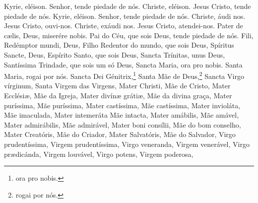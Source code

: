 \begin{paracol}{2}
Kyrie, eléison.
\switchcolumn
Senhor, tende piedade de nós.
\switchcolumn*
Christe, eléison.
\switchcolumn
Jesus Cristo, tende piedade de nós.
\switchcolumn*
Kyrie, eléison.
\switchcolumn
Senhor, tende piedade de nós.
\switchcolumn*
Christe, áudi nos.
\switchcolumn
Jesus Cristo, ouvi-nos.
\switchcolumn*
Christe, exáudi nos.
\switchcolumn
Jesus Cristo, atendei-nos.
\switchcolumn*
Pater de cælis, Deus, miserére nobis.
\switchcolumn
Pai do Céu, que sois Deus, tende piedade de nós.
\switchcolumn*
Fili, Redémptor mundi, Deus,
\switchcolumn
Filho Redentor do mundo, que sois Deus,
\switchcolumn*
Spíritus Sancte, Deus,
\switchcolumn
Espírito Santo, que sois Deus,
\switchcolumn*
Sancta Trínitas, unus Deus,
\switchcolumn
Santíssima Trindade, que sois um só Deus,
\switchcolumn*
Sancta Maria, ora pro nobis.
\switchcolumn
Santa Maria, rogai por nós.
\switchcolumn*
Sancta Dei Génitrix,\footnote[2]{ora pro nobis.\label{ora}}
\switchcolumn
Santa Mãe de Deus,\footnote[2]{rogai por nós.\label{rogai}}
\switchcolumn*
Sancta Virgo vírginum,
\switchcolumn
Santa Virgem das Virgens,
\switchcolumn*
Mater Christi,
\switchcolumn
Mãe de Cristo,
\switchcolumn*
Mater Ecclésiæ,
\switchcolumn
Mãe da Igreja,
\switchcolumn*
Mater divínæ grátiæ,
\switchcolumn
Mãe da divina graça,
\switchcolumn*
Mater puríssima,
\switchcolumn
Mãe puríssima,
\switchcolumn*
Mater castíssima,
\switchcolumn
Mãe castíssima,
\switchcolumn*
Mater invioláta,
\switchcolumn
Mãe imaculada,
\switchcolumn*
Mater intemeráta
\switchcolumn
Mãe intacta,
\switchcolumn*
Mater amábilis,
\switchcolumn
Mãe amável,
\switchcolumn*
Mater admirábilis,
\switchcolumn
Mãe admirável,
\switchcolumn*
Mater boni consílii,
\switchcolumn
Mãe do bom conselho,
\switchcolumn*
Mater Creatóris,
\switchcolumn
Mãe do Criador,
\switchcolumn*
Mater Salvatóris,
\switchcolumn
Mãe do Salvador,
\switchcolumn*
Virgo prudentíssima,
\switchcolumn
Virgem prudentíssima,
\switchcolumn*
Virgo veneranda,
\switchcolumn
Virgem venerável,
\switchcolumn*
Virgo prædicánda,
\switchcolumn
Virgem louvável,
\switchcolumn*
Virgo potens,
\switchcolumn
Virgem poderosa,

\end{paracol}
